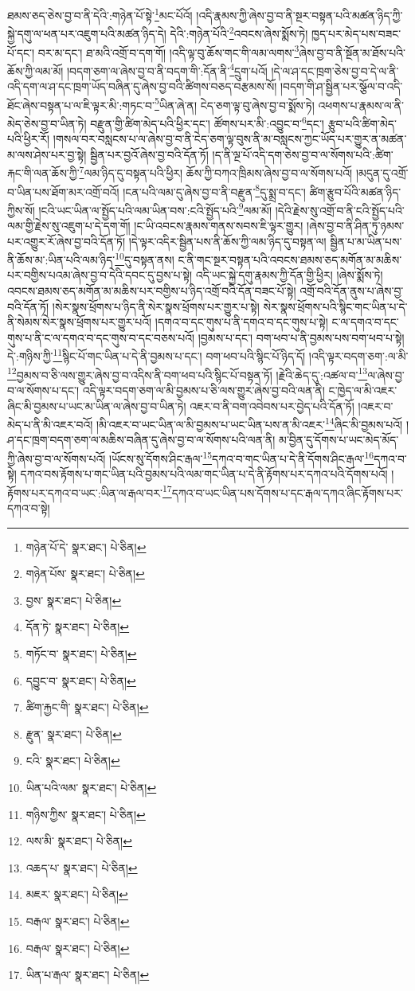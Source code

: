 ཐམས་ཅད་ཅེས་བྱ་བ་ནི་དེའི་:གཉེན་པོ་སྟེ་\footnote{གཉེན་པོ་དེ་  སྣར་ཐང་།  པེ་ཅིན། }མང་པོའོ། །འདི་རྣམས་ཀྱི་ཞེས་བྱ་བ་ནི་སྔར་བསྟན་པའི་མཚན་ཉིད་ཀྱི་སྐྱེ་དགུ་ལ་ཕན་པར་འཇུག་པའི་མཚན་ཉིད་དེ། དེའི་:གཉེན་པོའི་\footnote{གཉེན་པོས་  སྣར་ཐང་།  པེ་ཅིན། }འབངས་ཞེས་སྨོས་ཏེ། ཁྱད་པར་མེད་པས་བཟང་པོ་དང་། བར་མ་དང་། ཐ་མའི་འགྲོ་བ་དག་གོ། །འདི་ལྟ་བུ་ཆོས་གང་གི་ལམ་ལགས་\footnote{བྱས་  སྣར་ཐང་།  པེ་ཅིན། }ཞེས་བྱ་བ་ནི་སྔོན་མ་ཐོས་པའི་ཆོས་ཀྱི་ལམ་མོ། །བདག་ཅག་ལ་ཞེས་བྱ་བ་ནི་བདག་གི་:དོན་ནི་\footnote{དོན་ཏེ་  སྣར་ཐང་།  པེ་ཅིན། }དྲུག་པའོ། །དེ་ལ་ཤ་དང་ཁྲག་ཅེས་བྱ་བ་དེ་ལ་ནི་འདི་དག་ལ་ཤ་དང་ཁྲག་ཡོད་བཞིན་དུ་ཞེས་བྱ་བའི་ཚིགས་བཅད་བརྩམས་སོ། །བདག་གི་ཤ་སྦྱིན་པར་སྩོལ་བ་འདི་ཐོང་ཞེས་བསྟན་པ་ལ་ཇི་ལྟར་མི་:གཏང་བ་\footnote{གཏོང་བ་  སྣར་ཐང་།  པེ་ཅིན། }ཡིན་ཞེ་ན། ངེད་ཅག་ལྟ་བུ་ཞེས་བྱ་བ་སྨོས་ཏེ། འཕགས་པ་རྣམས་ལ་ནི་མེད་ཅེས་བྱ་བ་ཡིན་ཏེ། བརྫུན་གྱི་ཚིག་མེད་པའི་ཕྱིར་དང་། ཚོགས་པར་མི་:འབྱུང་བ་\footnote{དབྱུང་བ་  སྣར་ཐང་།  པེ་ཅིན། }དང་། རྩུབ་པའི་ཚིག་མེད་པའི་ཕྱིར་རོ། །གསལ་བར་བསླངས་པ་ལ་ཞེས་བྱ་བ་ནི་ངེད་ཅག་ལྟ་བུས་ནི་མ་བསླངས་ཀྱང་ཡོད་པར་གྱུར་ན་མཚན་མ་ལས་ཤེས་པར་བྱ་སྟེ། སྦྱིན་པར་བྱའོ་ཞེས་བྱ་བའི་དོན་ཏོ། །ད་ནི་ལྔ་པོ་འདི་དག་ཅེས་བྱ་བ་ལ་སོགས་པའི་:ཚིག་རྐང་གི་ལན་ཆོས་ཀྱི་\footnote{ཚིག་རྐྱང་གི་  སྣར་ཐང་།  པེ་ཅིན། }ལམ་ཉིད་དུ་བསྟན་པའི་ཕྱིར། ཆོས་ཀྱི་བཀའ་ཁྲིམས་ཞེས་བྱ་བ་ལ་སོགས་པའོ། །མདུན་དུ་འགྲོ་བ་ཡིན་པས་ཐོག་མར་འགྲོ་བའོ། །ངན་པའི་ལམ་དུ་ཞེས་བྱ་བ་ནི་བརྫུན་\footnote{རྫུན་  སྣར་ཐང་།  པེ་ཅིན། }དུ་སྨྲ་བ་དང་། ཚིག་རྩུབ་པོའི་མཚན་ཉིད་ཀྱིས་སོ། །ངའི་ཡང་ཡིན་ལ་སྤྱོད་པའི་ལམ་ཡིན་བས་:ངའི་སྤྱོད་པའི་\footnote{ངའི་  སྣར་ཐང་།  པེ་ཅིན། }ལམ་མོ། །དེའི་རྗེས་སུ་འགྲོ་བ་ནི་ངའི་སྤྱོད་པའི་ལམ་གྱི་རྗེས་སུ་འཇུག་པ་དེ་དག་གོ། །ང་ཡི་འབངས་རྣམས་གནས་སབས་ཇི་ལྟར་གྱུར། །ཞེས་བྱ་བ་ནི་ཤིན་ཏུ་ཉམས་པར་འགྱུར་རོ་ཞེས་བྱ་བའི་དོན་ཏོ། །དེ་ལྟར་འདིར་སྦྱིན་པས་ནི་ཆོས་ཀྱི་ལམ་ཉིད་དུ་བསྟན་ལ། སྦྱིན་པ་མ་ཡིན་པས་ནི་ཆོས་མ་:ཡིན་པའི་ལམ་ཉིད་\footnote{ཡིན་པའི་ལམ་  སྣར་ཐང་།  པེ་ཅིན། }དུ་བསྟན་ནས། ང་ནི་གང་སྔར་བསྟན་པའི་འབངས་ཐམས་ཅད་མགོན་མ་མཆིས་པར་བགྱིས་པའམ་ཞེས་བྱ་བ་དེའི་དབང་དུ་བྱས་པ་སྟེ། འདི་ཡང་སྐྱེ་དགུ་རྣམས་ཀྱི་དོན་གྱི་ཕྱིར། །ཞེས་སྨོས་ཏེ། འབངས་ཐམས་ཅད་མགོན་མ་མཆིས་པར་བགྱིས་པ་ཉིད་འགྲོ་བའི་དོན་བཟང་པོ་སྟེ། འགྲོ་བའི་དོན་ནུས་པ་ཞེས་བྱ་བའི་དོན་ཏོ། །སེར་སྣས་ཕྲོགས་པ་ཉིད་ནི་སེར་སྣས་ཕྲོགས་པར་གྱུར་པ་སྟེ། སེར་སྣས་ཕྲོགས་པའི་སྙིང་གང་ཡིན་པ་དེ་ནི་སེམས་སེར་སྣས་ཕྲོགས་པར་གྱུར་པའོ། །དགའ་བ་དང་གུས་པ་ནི་དགའ་བ་དང་གུས་པ་སྟེ། ང་ལ་དགའ་བ་དང་གུས་པ་ནི་ང་ལ་དགའ་བ་དང་གུས་བ་དང་བཅས་པའོ། །བྱམས་པ་དང་། བག་ཕབ་པ་ནི་བྱམས་པས་བག་ཕབ་པ་སྟེ། དེ་:གཉིས་ཀྱི་\footnote{གཉིས་ཀྱིས་  སྣར་ཐང་།  པེ་ཅིན། }སྙིང་པོ་གང་ཡིན་པ་དེ་ནི་བྱམས་པ་དང་། བག་ཕབ་པའི་སྙིང་པོ་ཉིད་དོ། །འདི་ལྟར་བདག་ཅག་:ལ་མི་\footnote{ལས་མི་  སྣར་ཐང་།  པེ་ཅིན། }བྱམས་བ་ཅི་ལས་གྱུར་ཞེས་བྱ་བ་འདིས་ནི་བག་ཕབ་པའི་སྙིང་པོ་བསྟན་ཏོ། །རྗེའི་ཆེད་དུ་:འཚལ་བ་\footnote{འཆད་པ་  སྣར་ཐང་།  པེ་ཅིན། }ལ་ཞེས་བྱ་བ་ལ་སོགས་པ་དང་། འདི་ལྟར་བདག་ཅག་ལ་མི་བྱམས་པ་ཅི་ལས་གྱུར་ཞེས་བྱ་བའི་ལན་ནི། ང་ཁྱེད་ལ་མི་འཇར་ཞིང་མི་བྱམས་པ་ཡང་མ་ཡིན་ལ་ཞེས་བྱ་བ་ཡིན་ཏེ། འཇར་བ་ནི་བག་འབེབས་པར་བྱེད་པའི་དོན་ཏོ། །འཇར་བ་མེད་པ་ནི་མི་འཇར་བའོ། །མི་འཇར་བ་ཡང་ཡིན་ལ་མི་བྱམས་པ་ཡང་ཡིན་པས་ན་མི་འཇར་\footnote{མཇར་  སྣར་ཐང་།  པེ་ཅིན། }ཞིང་མི་བྱམས་པའོ། །ཤ་དང་ཁྲག་བདག་ཅག་ལ་མཆིས་བཞིན་དུ་ཞེས་བྱ་བ་ལ་སོགས་པའི་ལན་ནི། མ་བྱིན་དུ་དོགས་པ་ཡང་མེད་མོད་ཀྱི་ཞེས་བྱ་བ་ལ་སོགས་པའོ། །ཡོངས་སུ་དོགས་ཤིང་རྒལ་\footnote{བརྒལ་  སྣར་ཐང་།  པེ་ཅིན། }དཀའ་བ་གང་ཡིན་པ་དེ་ནི་དོགས་ཤིང་རྒལ་\footnote{བརྒལ་  སྣར་ཐང་།  པེ་ཅིན། }དཀའ་བ་སྟེ། དཀའ་བས་རྟོགས་པ་གང་ཡིན་པའི་བྱམས་པའི་ལམ་གང་ཡིན་པ་དེ་ནི་རྟོགས་པར་དཀའ་པའི་དོགས་པའོ། །རྟོགས་པར་དཀའ་བ་ཡང་:ཡིན་ལ་རྒལ་བར་\footnote{ཡིན་པ་རྒལ་  སྣར་ཐང་།  པེ་ཅིན། }དཀའ་བ་ཡང་ཡིན་པས་དོགས་པ་དང་རྒལ་དཀའ་ཞིང་རྟོགས་པར་དཀའ་བ་སྟེ། 
